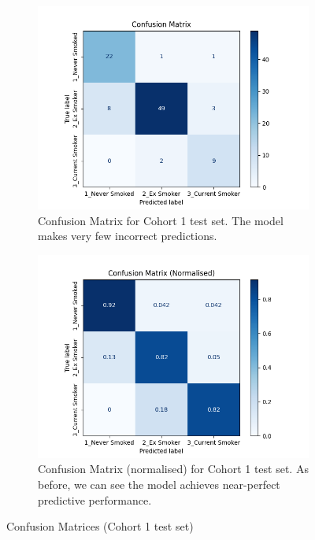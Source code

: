 \documentclass{article}
\begin{document}
\begin{figure}[H]
    \centering
    \begin{subfigure}{0.75\textwidth}
        \centering
        \includegraphics[width=\linewidth]{cohort1_cm.png}
        \caption{Confusion Matrix for Cohort 1 test set. The model makes very few incorrect predictions.}
    \end{subfigure}
    \begin{subfigure}{0.75\textwidth}
        \centering
        \includegraphics[width=\linewidth]{cohort1_cm_n.png}
        \caption{Confusion Matrix (normalised) for Cohort 1 test set. As before, we can see the model achieves near-perfect predictive performance.}
    \end{subfigure}
    \caption{Confusion Matrices (Cohort 1 test set)}
    \label{fig:cohort1-cm}
\end{figure}
\end{document}
